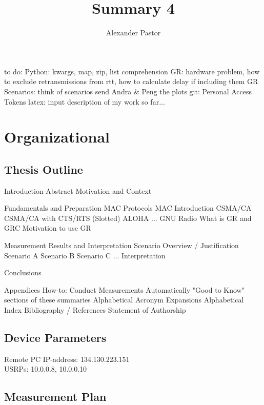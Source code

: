\documentclass{article}
\begin{document}
	
\title{Summary 4}
\author{Alexander Pastor}
\maketitle
\tableofcontents
\newpage

to do:
Python: kwargs, map, zip, list comprehension
GR: hardware problem, how to exclude retransmissions from rtt, how to calculate delay if including them
GR Scenarios: think of scenarios
send Andra \& Peng the plots
git: Personal Access Tokens
latex: input
description of my work so far...

\section{Organizational}

\subsection{Thesis Outline}

\begin{outline}[enumerate]
	\1 Introduction
		\2 Abstract
		\2 Motivation and Context
		
	\1 Fundamentals and Preparation
		\2 MAC Protocols
			\3 MAC Introduction
		 	\3 CSMA/CA
		 	\3 CSMA/CA with CTS/RTS
		 	\3 (Slotted) ALOHA
		 	\3 ...
		\2 GNU Radio 
			\3 What is GR and GRC
			\3 Motivation to use GR
	
	\1 Measurement Results and Interpretation
		\2 Scenario Overview / Justification
		\2 Scenario A
		\2 Scenario B
		\2 Scenario C
		\2 ...
		\2 Interpretation
		
	\1 Conclusions
	
	\1 Appendices
		\2 How-to: Conduct Measurements Automatically
		\2 "Good to Know" sections of these summaries
		\2 Alphabetical Acronym Expansions
		\2 Alphabetical Index
		\2 Bibliography / References
		\2 Statement of Authorship
\end{outline}

\subsection{Device Parameters}

Remote PC IP-address: 134.130.223.151 \\
USRPs: 10.0.0.8, 10.0.0.10

\subsection{Measurement Plan}
\end{document}
